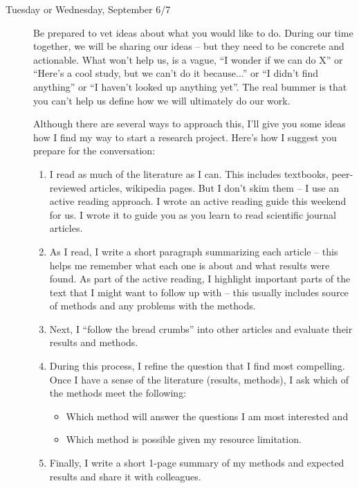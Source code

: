 \documentclass{tufte-handout}\usepackage[]{graphicx}\usepackage[]{color}
\begin{document}
\begin{description}
  \item[Tuesday or Wednesday, September 6/7] Be prepared to vet ideas about what you would like to do. During our time together, we will be sharing our ideas -- but they need to be concrete and actionable. What won't help us, is a vague, ``I wonder if we can do  X'' or ``Here's a cool study, but we can't do it because...'' or ``I didn't find anything'' or  ``I haven't looked up anything yet''. The real bummer is that you can't help us define how we will ultimately do our work. 
  
Although there are several ways to approach this, I'll give you some ideas how I find my way to start a research project. Here's how I suggest you prepare for the conversation: 
  
  \begin{enumerate}
  \item I read as much of the literature as I can. This includes textbooks, peer-reviewed articles, wikipedia pages. But I don't skim them -- I use an active reading approach. I wrote an active reading guide this weekend for us. I wrote it to guide you as you learn to read scientific journal articles.
  \item As I read, I write a short paragraph summarizing each article -- this helps me remember what each one is about and what results were found.
As part of the active reading, I highlight important parts of the text that I might want to follow up with -- this usually includes source of methods and any problems with the methods. 
  \item Next, I ``follow the bread crumbs'' into other articles and evaluate their results and methods. 
  \item During this process, I refine the question that I find most compelling. 
Once I have a sense of the literature (results, methods), I ask which of the methods meet the following: 
\begin{itemize}
  \item Which method will answer the questions I am most interested and 
  \item Which method is possible given my resource limitation.
\end{itemize}

\item Finally, I write a short 1-page summary of my methods and expected results and share it with colleagues. 
\end{enumerate}


\end{description}
\end{document}
